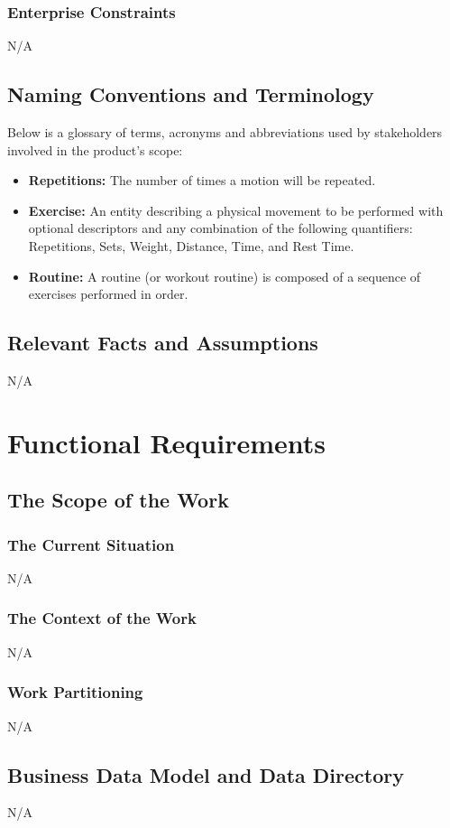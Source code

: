 \documentclass[12pt]{article}
\begin{document}
\subsubsection{Enterprise Constraints}
N/A

\subsection{Naming Conventions and Terminology}
Below is a glossary of terms, acronyms and abbreviations used by stakeholders involved in the product's scope:
\begin{itemize}
	\item \textbf{Repetitions: } The number of times a motion will be repeated.
	\item \textbf{Exercise: } An entity describing a physical movement to be performed with optional descriptors and any combination of the following quantifiers: Repetitions, Sets, Weight, Distance, Time, and Rest Time. 
	\item \textbf{Routine: } A routine (or workout routine) is composed of a sequence of exercises performed in order.
\end{itemize}
\subsection{Relevant Facts and Assumptions}
N/A
\section{Functional Requirements}
\subsection{The Scope of the Work}
\subsubsection{The Current Situation}
N/A
\subsubsection{The Context of the Work}
N/A
\subsubsection{Work Partitioning}
N/A
\subsection{Business Data Model and Data Directory}
N/A
\end{document}
